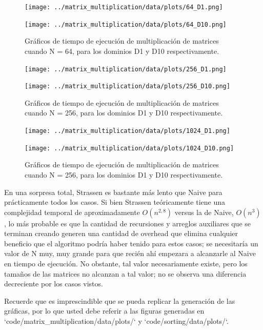 \begin{figure}[H]
    \centering
    \begin{minipage}[t]{0.5\textwidth}
        \texttt{[image: ../matrix\_multiplication/data/plots/64\_D1.png]}
    \end{minipage}%
    \begin{minipage}[t]{0.5\textwidth}
        \texttt{[image: ../matrix\_multiplication/data/plots/64\_D10.png]}
     \end{minipage}%
    \caption{Gráficos de tiempo de ejecución de multiplicación de matrices cuando N = 64, para los dominios D1 y D10 respectivamente.}
    \label{fig:matrixN2}
\end{figure}

\begin{figure}[H]
    \centering
    \begin{minipage}[t]{0.5\textwidth}
        \texttt{[image: ../matrix\_multiplication/data/plots/256\_D1.png]}
    \end{minipage}%
    \begin{minipage}[t]{0.5\textwidth}
        \texttt{[image: ../matrix\_multiplication/data/plots/256\_D10.png]}
     \end{minipage}%
    \caption{Gráficos de tiempo de ejecución de multiplicación de matrices cuando N = 256, para los dominios D1 y D10 respectivamente.}
    \label{fig:matrixN2}
\end{figure}

\begin{figure}[H]
    \centering
    \begin{minipage}[t]{0.5\textwidth}
        \texttt{[image: ../matrix\_multiplication/data/plots/1024\_D1.png]}
    \end{minipage}%
    \begin{minipage}[t]{0.5\textwidth}
        \texttt{[image: ../matrix\_multiplication/data/plots/1024\_D10.png]}
     \end{minipage}%
    \caption{Gráficos de tiempo de ejecución de multiplicación de matrices cuando N = 256, para los dominios D1 y D10 respectivamente.}
    \label{fig:matrixN2}
\end{figure}

En una sorpresa total, Strassen es bastante más lento que Naive para prácticamente todos los casos. Si bien Strassen teóricamente tiene una complejidad temporal de aproximadamente $O(n^{2,8})$ versus la de Naive, $O(n^3)$, lo más probable es que la cantidad de recursiones y arreglos auxiliares que se terminan creando generen una cantidad de overhead que elimina cualquier beneficio que el algoritmo podría haber tenido para estos casos; se necesitaría un valor de N muy, muy grande para que recién ahí empezara a alcanzarle al Naive en tiempo de ejecución. No obstante, tal valor necesariamente existe, pero los tamaños de las matrices no alcanzan a tal valor; no se observa una diferencia decreciente por los casos vistos.


\begin{mdframed}
    Recuerde que es imprescindible que se pueda replicar la generación de las gráficas, por lo que usted debe referir a las figuras generadas en `code/matrix\_multiplication/data/plots/` y `code/sorting/data/plots/`.
\end{mdframed}

